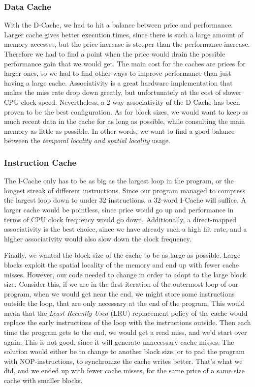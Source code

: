 \documentclass[a4paper,9pt,fleqn]{article}
\begin{document}
\subsubsection{Data Cache}
With the D-Cache, we had to hit a balance between price and performance. Larger cache gives better execution times, 
since there is such a large amount of memory accesses, but the price increase is steeper than the performance increase.
Therefore we had to find a point when the price would drain the possible performance gain that we would get. The main
cost for the caches are prices for larger ones, so we had to find other ways to improve performance than just having
a large cache. Associativity is a great hardware implementation that makes the miss rate drop down greatly, but unfortunately
at the cost of slower CPU clock speed. Nevertheless, a 2-way associativity of the D-Cache has been proven to be the 
best configuration. As for block sizes, we would want to keep as much recent data in the cache for as long as possible, while
consulting the main memory as little as possible. In other words, we want to find a good balance between the {\it temporal
locality and spatial locality} usage. 

\subsubsection{Instruction Cache}
The I-Cache only has to be as big as the largest loop in the program, or the longest streak of different instructions. 
Since our program managed to compress the largest loop down to under 32 instructions, a 32-word I-Cache will suffice.
A larger cache would be pointless, since price would go up and performance in terms of CPU clock frequency would go down.
Additionally, a direct-mapped associativity is the best choice, since we have already such a high hit rate, and a higher
associativity would also slow down the clock frequency.

Finally, we wanted the block size of the cache to be as large as possible. Large blocks exploit the spatial locality
of the memory and end up with fewer cache misses. However, our code needed to change in order to adopt to the large block size.
Consider this, if we are in the first iteration of the outermost loop of our program, when we would get near the end, we
might store some instructions outside the loop, that are only necessary at the end of the program. This would mean that
the {\it Least Recently Used} (LRU) replacement policy of the cache would replace the early instructions of the loop with the instructions
outside. Then each time the program gets to the end, we would get a read miss, and we'd start over again. This is not good,
since it will generate unnecessary cache misses. The solution would either be to change to another block size, or to pad
the program with NOP-instructions, to synchronize the cache writes better. That's what we did, and we ended up with fewer
cache misses, for the same price of a same size cache with smaller blocks.
\end{document}

